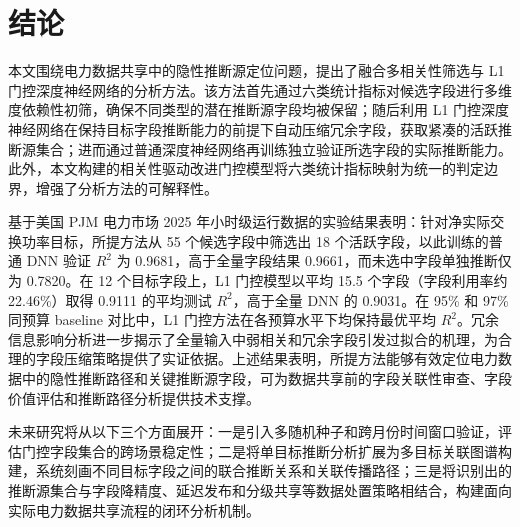 \documentclass[UTF8,zihao=5,twoside]{ctexart}
\numberwithin{equation}{section}
\begin{document}
\section{结论}
本文围绕电力数据共享中的隐性推断源定位问题，提出了融合多相关性筛选与 L1 门控深度神经网络的分析方法。该方法首先通过六类统计指标对候选字段进行多维度依赖性初筛，确保不同类型的潜在推断源字段均被保留；随后利用 L1 门控深度神经网络在保持目标字段推断能力的前提下自动压缩冗余字段，获取紧凑的活跃推断源集合；进而通过普通深度神经网络再训练独立验证所选字段的实际推断能力。此外，本文构建的相关性驱动改进门控模型将六类统计指标映射为统一的判定边界，增强了分析方法的可解释性。

基于美国 PJM 电力市场 2025 年小时级运行数据的实验结果表明：针对净实际交换功率目标，所提方法从 55 个候选字段中筛选出 18 个活跃字段，以此训练的普通 DNN 验证 $R^2$ 为 0.9681，高于全量字段结果 0.9661，而未选中字段单独推断仅为 0.7820。在 12 个目标字段上，L1 门控模型以平均 15.5 个字段（字段利用率约 22.46\%）取得 0.9111 的平均测试 $R^2$，高于全量 DNN 的 0.9031。在 95\% 和 97\% 同预算 baseline 对比中，L1 门控方法在各预算水平下均保持最优平均 $R^2$。冗余信息影响分析进一步揭示了全量输入中弱相关和冗余字段引发过拟合的机理，为合理的字段压缩策略提供了实证依据。上述结果表明，所提方法能够有效定位电力数据中的隐性推断路径和关键推断源字段，可为数据共享前的字段关联性审查、字段价值评估和推断路径分析提供技术支撑。

未来研究将从以下三个方面展开：一是引入多随机种子和跨月份时间窗口验证，评估门控字段集合的跨场景稳定性；二是将单目标推断分析扩展为多目标关联图谱构建，系统刻画不同目标字段之间的联合推断关系和关联传播路径；三是将识别出的推断源集合与字段降精度、延迟发布和分级共享等数据处置策略相结合，构建面向实际电力数据共享流程的闭环分析机制。
\end{document}
